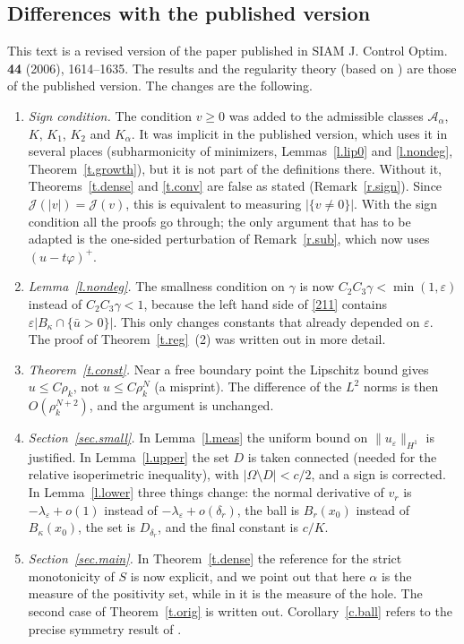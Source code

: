 \documentclass[11pt]{amsart}
\theoremstyle{definition}
\theoremstyle{remark}
\numberwithin{equation}{section}
\newcommand{\cA}{\mathcal{A}}
\newcommand{\cJ}{\mathcal{J}}
\begin{document}
\subsection*{Differences with the published version}
This text is a revised version of the paper published in SIAM J. Control Optim. \textbf{44} (2006), 1614--1635. The results and the regularity theory (based on \cite{AC}) are those of the published version. The changes are the following.
\begin{enumerate}
\item \emph{Sign condition.} The condition $v\ge0$ was added to the admissible classes $\cA_\alpha$, $K$, $K_1$, $K_2$ and $K_\alpha$. It was implicit in the published version, which uses it in several places (subharmonicity of minimizers, Lemmas~\ref{l.lip0} and \ref{l.nondeg}, Theorem~\ref{t.growth}), but it is not part of the definitions there. Without it, Theorems~\ref{t.dense} and \ref{t.conv} are false as stated (Remark~\ref{r.sign}). Since $\cJ(|v|)=\cJ(v)$, this is equivalent to measuring $|\{v\neq0\}|$. With the sign condition all the proofs go through; the only argument that has to be adapted is the one-sided perturbation of Remark~\ref{r.sub}, which now uses $(u-t\varphi)^+$.
\item \emph{Lemma~\ref{l.nondeg}.} The smallness condition on $\gamma$ is now $C_2C_3\gamma<\min(1,\varepsilon)$ instead of $C_2C_3\gamma<1$, because the left hand side of \eqref{211} contains $\varepsilon|B_\kappa\cap\{\bar u>0\}|$. This only changes constants that already depended on $\varepsilon$. The proof of Theorem~\ref{t.reg}~(2) was written out in more detail.
\item \emph{Theorem~\ref{t.const}.} Near a free boundary point the Lipschitz bound gives $u\le C\rho_k$, not $u\le C\rho_k^N$ (a misprint). The difference of the $L^2$ norms is then $O(\rho_k^{N+2})$, and the argument is unchanged.
\item \emph{Section~\ref{sec.small}.} In Lemma~\ref{l.meas} the uniform bound on $\|u_\varepsilon\|_{H^1}$ is justified. In Lemma~\ref{l.upper} the set $D$ is taken connected (needed for the relative isoperimetric inequality), with $|\Omega\setminus D|<c/2$, and a sign is corrected. In Lemma~\ref{l.lower} three things change: the normal derivative of $v_r$ is $-\lambda_\varepsilon+o(1)$ instead of $-\lambda_\varepsilon+o(\delta_r)$, the ball is $B_r(x_0)$ instead of $B_\kappa(x_0)$, the set is $D_{\delta_r}$, and the final constant is $c/K$.
\item \emph{Section~\ref{sec.main}.} In Theorem~\ref{t.dense} the reference for the strict monotonicity of $S$ is now explicit, and we point out that here $\alpha$ is the measure of the positivity set, while in \cite{FBRW1} it is the measure of the hole. The second case of Theorem~\ref{t.orig} is written out. Corollary~\ref{c.ball} refers to the precise symmetry result of \cite{FBRW1}.

\end{enumerate}
\end{document}
